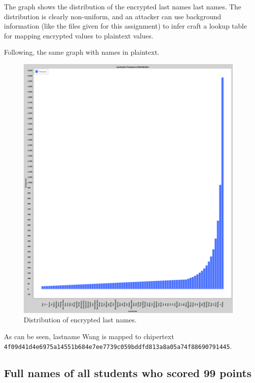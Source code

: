 The graph shows the distribution of the encrypted last names last names. The distribution is clearly non-uniform, and an attacker can use background information (like the files given for this assignment) to infer craft a lookup table for mapping encrypted values to plaintext values.

Following, the same graph with names in plaintext.

\begin{figure}[h!]
    \centering
    \includegraphics[width=\textwidth]{03-ex2/Lastname_Frequency_Distribution_Plain.png}
    \caption{Distribution of encrypted last names.}
    \label{fig:Distribution-of-last-names-plain}
\end{figure}

As can be seen, lastname Wang is mapped to chipertext \\ \texttt{4f09d41d4e6975a14551b684e7ee7739c059bddfd813a8a05a74f88690791445}.

\subsection{Full names of all students who scored 99 points}

